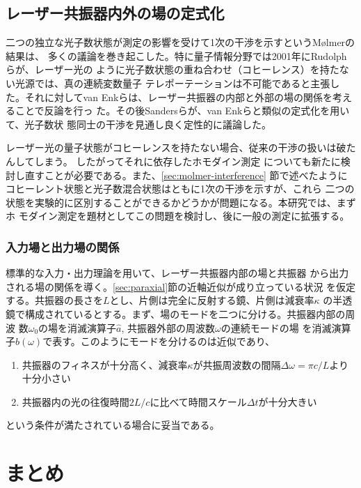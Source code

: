 \documentclass[11pt]{jsarticle}
\newcommand{\ope}[1]{\hat{#1}}
\begin{document}
\subsection{レーザー共振器内外の場の定式化}
\label{sec:laser-state}

二つの独立な光子数状態が測定の影響を受けて1次の干渉を示すというM{\o}lmerの結果は、
多くの議論を巻き起こした。特に量子情報分野では2001年にRudolphらが、レーザー光の
ように光子数状態の重ね合わせ（コヒーレンス）を持たない光源では、真の連続変数量子
テレポーテーションは不可能であると主張した\cite{Rudolph2001}。それに対してvan
Enkらは、レーザー共振器の内部と外部の場の関係を考えることで反論を行っ
た\cite{vanEnk2002}。その後Sandersらが、van Enkらと類似の定式化を用いて、光子数状
態同士の干渉を見通し良く定性的に議論した\cite{Sanders2003}。

レーザー光の量子状態がコヒーレンスを持たない場合、従来の干渉の扱いは破たんしてしまう。
したがってそれに依存したホモダイン測定
についても新たに検討し直すことが必要である。また、\ref{sec:molmer-interference}
節で述べたようにコヒーレント状態と光子数混合状態はともに1次の干渉を示すが、これら
二つの状態を実験的に区別することができるかどうかが問題になる。本研究では、まずホ
モダイン測定を題材としてこの問題を検討し、後に一般の測定に拡張する。

\subsubsection*{入力場と出力場の関係}

標準的な入力・出力理論\cite{input-output}を用いて、レーザー共振器内部の場と共振器
から出力される場の関係を導く。\ref{sec:paraxial}節の近軸近似が成り立っている状況
を仮定する。共振器の長さを$L$とし、片側は完全に反射する鏡、片側は減衰率$\kappa$
の半透鏡で構成されているとする。まず、場のモードを二つに分ける。共振器内部の周波
数$\omega_0$の場を消滅演算子$\ope{a}$, 共振器外部の周波数$\omega$の連続モードの場
を消滅演算子$\ope{b}(\omega)$で表す。このようにモードを分けるのは近似であり、
\begin{enumerate}
\item 共振器のフィネスが十分高く、減衰率$\kappa$が共振周波数の間隔$\Delta\omega
  = \pi c/L$より十分小さい
\item 共振器内の光の往復時間$2L/c$に比べて時間スケール$\Delta t$が十分大きい
\end{enumerate}
という条件が満たされている場合に妥当である\cite{Vogel}。

\section{まとめ}
\end{document}
